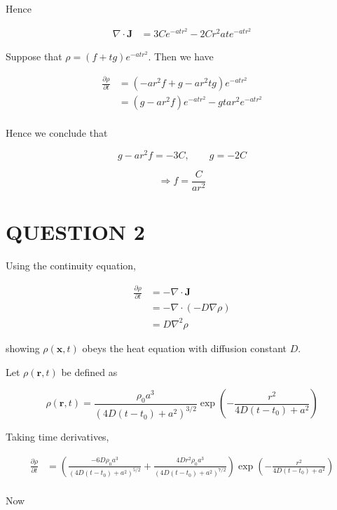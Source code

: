 \documentclass[a4paper]{article}
\begin{document}
Hence

\begin{align*}
\nabla \cdot \mathbf{J} & = 3 C e^{-atr^{2}} - 2C  r^{2} ate^{-atr^{2}}
\end{align*}

Suppose that $ \rho = (f + tg)e^{-atr^{2}} $. Then we have

\begin{align*}
\frac{\partial \rho }{\partial t} & = (-ar^{2} f + g - ar^{2}tg)e^{-atr^{2}} \\
& = (g - ar^{2} f) e^{-atr^{2}} - gt ar^{2} e^{-atr^{2}} \\
\end{align*}

Hence we conclude that

\[ g - a r^{2} f = - 3 C , \qquad g = -2C \]

\[ \Rightarrow f = \frac{C}{ar^{2}} \]

\section{QUESTION 2}

Using the continuity equation, 

\begin{align*}
\frac{\partial \rho }{\partial t} & = - \nabla \cdot \mathbf{J}  \\
& = - \nabla \cdot (-D \nabla  \rho) \\
& = D \nabla^{2} \rho 
\end{align*}

showing $ \rho(\mathbf{x},t) $ obeys the heat equation with diffusion constant $ D $.

Let $ \rho(\mathbf{r},t) $ be defined as 

\[ \rho(\mathbf{r},t) = \frac{\rho_{0}a^{3}}{	(4D(t - t_{0}) + a^{2})^{3/2}} \exp \left(  - \frac{r^{2}}{4D(t - t_{0}) + a^{2}} \right)  \]

Taking time derivatives,

\begin{align*}
\frac{\partial \rho }{\partial t} & = \left(  \frac{-6D \rho_{0}a^{3}}{	(4D(t - t_{0}) + a^{2})^{5/2}} + \frac{4D r^{2} \rho_{0}a^{3} }{(4D(t-t_{0}) + a^{2})^{7/2}} \right) \exp \left( - \frac{r^{2}}{4D(t - t_{0}) + a^{2}} \right) \\
\end{align*}

Now

\end{document}
